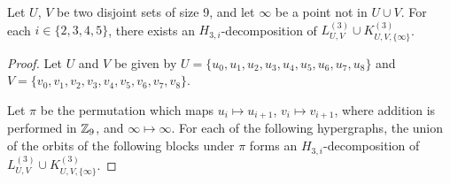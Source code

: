 \begin{subappendices}

\begin{example} \label{eg:H_3i-l99-k991}
Let $U$, $V$ be two disjoint sets of size 9, and let $\infty$ be a point not in $U \cup V$.
For each $i \in \{2,3,4,5\}$, there exists an $H_{3,i}$-decomposition of $L_{U,V}^{(3)} \cup K_{U,V,\{\infty\}}^{(3)}$.
\end{example}

\begin{proof}
Let $U$ and $V$ be given by
    $U = \{u_0, u_1, u_2, u_3, u_4, u_5, u_6, u_7, u_8\}$ and
    $V = \{v_0, v_1, v_2, v_3, v_4, v_5, v_6, v_7, v_8\}$.

Let $\pi$ be the permutation which maps $u_i \mapsto u_{i+1}$, $v_i \mapsto v_{i+1}$, where addition is performed in $\mathbb{Z}_9$, and $\infty \mapsto \infty$.
For each of the following hypergraphs, the union of the orbits of the following blocks under $\pi$ forms an $H_{3,i}$-decomposition of $L_{U,V}^{(3)} \cup K_{U,V,\{\infty\}}^{(3)}$.


\end{proof}
\end{subappendices}
